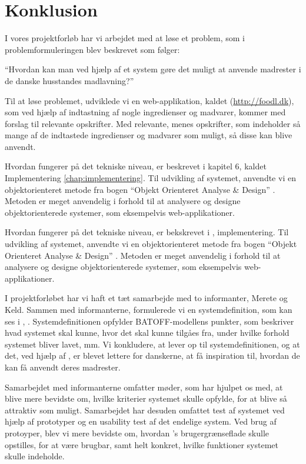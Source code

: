 \chapter{Konklusion}
\label{chap:konklusion}

I vores projektforløb har vi arbejdet med at løse et problem, som i problemformuleringen blev beskrevet som følger:

``Hvordan kan man ved hjælp af et system gøre det muligt at anvende madrester i de danske husstandes madlavning?''

Til at løse problemet, udviklede vi en web-applikation, kaldet \Foodl{} (\url{http://foodl.dk}), som ved hjælp af indtastning af nogle ingredienser og madvarer, kommer med forslag til relevante opskrifter. Med relevante, menes opskrifter, som indeholder så mange af de indtastede ingredienser og madvarer som muligt, så disse kan blive anvendt.

Hvordan \Foodl{} fungerer på det tekniske niveau, er beskrevet i kapitel 6, kaldet Implementering \ref{chap:implementering}. Til udvikling af systemet, anvendte vi en objektorienteret metode fra bogen ``Objekt Orienteret Analyse \& Design'' \cite{ooad}. Metoden er meget anvendelig i forhold til at analysere og designe objektorienterede systemer, som eksempelvis web-applikationer. 

Hvordan \Foodl{} fungerer på det tekniske niveau, er bekskrevet i , implementering. Til udvikling af systemet, anvendte vi en objektorienteret metode fra bogen ``Objekt Orienteret Analyse \& Design'' \cite{ooad}. Metoden er meget anvendelig i forhold til at analysere og designe objektorienterede systemer, som eksempelvis web-applikationer. 

I projektforløbet har vi haft et tæt samarbejde med to informanter, Merete og Keld. Sammen med informanterne, formulerede vi en systemdefinition, som kan ses i , . Systemdefinitionen opfylder BATOFF-modellens punkter, som beskriver hvad systemet skal kunne, hvor det skal kunne tilgåes fra, under hvilke forhold systemet bliver lavet, mm. Vi konkludere, at \Foodl{} lever op til systemdefinitionen, og at det, ved hjælp af \Foodl{}, er blevet lettere for danskerne, at få inspiration til, hvordan de kan få anvendt deres madrester.

Samarbejdet med informanterne omfatter møder, som har hjulpet os med, at blive mere bevidste om, hvilke kriterier systemet skulle opfylde, for at blive så attraktiv som muligt. Samarbejdet har desuden omfattet test af systemet ved hjælp af prototyper og en usability test af det endelige system. Ved brug af protoyper, blev vi mere bevidste om, hvordan \Foodl{}'s brugergrænseflade skulle opstilles, for at være brugbar, samt helt konkret, hvilke funktioner systemet skulle indeholde.

